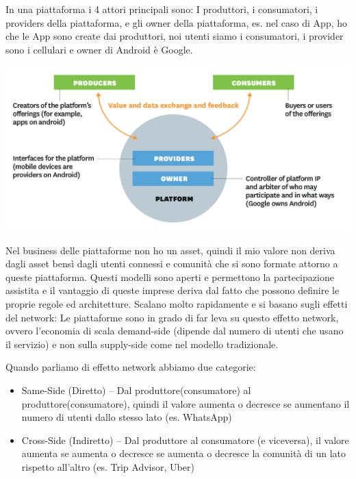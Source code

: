 \documentclass[a4page, 11pt]{article}
\begin{document}
In una piattaforma i 4 attori principali sono: I produttori, i
consumatori, i providers della piattaforma, e gli owner della
piattaforma, es. nel caso di App, ho che le App sono create dai
produttori, noi utenti siamo i consumatori, i provider sono i cellulari
e owner di Android è Google.
\begin{center}
	\includegraphics[scale=0.4]{image4.png}
\end{center}

Nel business delle piattaforme non ho un asset, quindi il mio valore non
deriva dagli asset bensì dagli utenti connessi e comunità che si sono
formate attorno a queste piattaforma. Questi modelli sono aperti e
permettono la partecipazione assistita e il vantaggio di queste imprese
deriva dal fatto che possono definire le proprie regole ed architetture.
Scalano molto rapidamente e si basano sugli effetti del network: Le
piattaforme sono in grado di far leva su questo effetto network, ovvero
l'economia di scala demand-side (dipende dal numero di utenti che usano
il servizio) e non sulla supply-side come nel modello tradizionale.

Quando parliamo di effetto network abbiamo due categorie:

\begin{itemize}
	 
	\item
	Same-Side (Diretto) -- Dal produttore(consumatore) al
	produttore(consumatore), quindi il valore aumenta o decresce se
	aumentano il numero di utenti dallo stesso lato (es. WhatsApp)
	\item
	Cross-Side (Indiretto) -- Dal produttore al consumatore (e viceversa),
	il valore aumenta se aumenta o decresce se aumenta o decresce la
	comunità di un lato rispetto all'altro (es. Trip Advisor, Uber)
\end{itemize}
\end{document}
